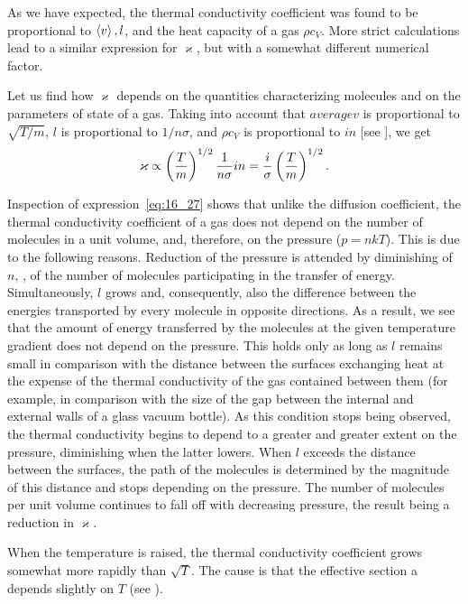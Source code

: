 \noindent
As we have expected, the thermal conductivity coefficient was found to be proportional to $\left\langle v \right\rangle, l$, and the heat capacity of a gas $\rho c_V$. More strict calculations lead to a similar expression for $\varkappa$, but with a somewhat different numerical factor.

Let us find how $\varkappa$ depends on the quantities characterizing molecules and on the parameters of state of a gas. Taking into account that $average{v}$ is proportional to $\sqrt{T/m}$, $l$ is proportional to $1/n\sigma$, and $\rho c_V$ is proportional to $in$ [see ], we get
\begin{equation}\label{eq:16_27}
    \varkappa \propto \left(\frac{T}{m}\right)^{1/2} \frac{1}{n\sigma} i n = \frac{i}{\sigma} \left(\frac{T}{m}\right)^{1/2}.
\end{equation}

Inspection of expression~\eqref{eq:16_27} shows that unlike the diffusion coefficient, the thermal conductivity coefficient of a gas does not depend on the number of molecules in a unit volume, and, therefore, on the pressure ($p=nkT$). This is due to the following reasons. Reduction of the pressure is attended by diminishing of $n$, \ie, of the number of molecules participating in the transfer of energy. Simultaneously, $l$ grows and, consequently, also the difference between the energies transported by every molecule in opposite directions. As a result, we see that the amount of energy transferred by the molecules at the given temperature gradient does not depend on the pressure. This holds only as long as $l$ remains small in comparison with the distance between the surfaces exchanging heat at the expense of the thermal conductivity of the gas contained between them (for example, in comparison with the size of the gap between the internal and external walls of a glass vacuum bottle). As this condition stops being observed, the thermal conductivity begins to depend to a greater and greater extent on the pressure, diminishing when the latter lowers. When $l$ exceeds the distance between the surfaces, the path of the molecules is determined by the magnitude of this distance and stops depending on the pressure. The number of molecules per unit volume continues to fall off with decreasing pressure, the result being a reduction in $\varkappa$.

When the temperature is raised, the thermal conductivity coefficient grows somewhat more rapidly than $\sqrt{T}$. The cause is that the effective section a depends slightly on $T$ (see ).

